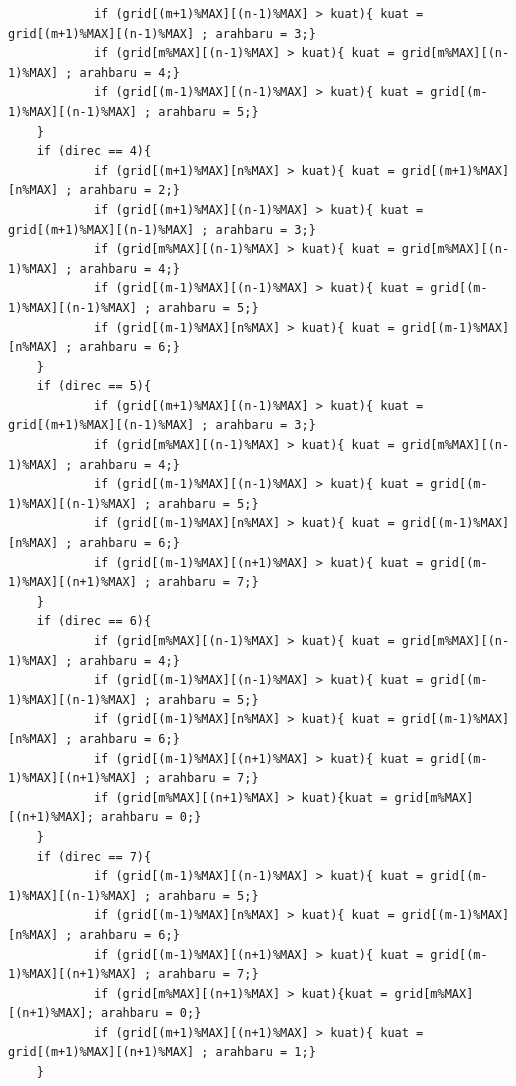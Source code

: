\documentclass[paper=a4, fontsize=11pt]{scrartcl}
\numberwithin{equation}{section} %
\numberwithin{figure}{section} %
\numberwithin{table}{section} %
\begin{document}
\begin{lstlisting}
            if (grid[(m+1)%MAX][(n-1)%MAX] > kuat){ kuat = grid[(m+1)%MAX][(n-1)%MAX] ; arahbaru = 3;}
            if (grid[m%MAX][(n-1)%MAX] > kuat){ kuat = grid[m%MAX][(n-1)%MAX] ; arahbaru = 4;}
            if (grid[(m-1)%MAX][(n-1)%MAX] > kuat){ kuat = grid[(m-1)%MAX][(n-1)%MAX] ; arahbaru = 5;}
    }
    if (direc == 4){
            if (grid[(m+1)%MAX][n%MAX] > kuat){ kuat = grid[(m+1)%MAX][n%MAX] ; arahbaru = 2;}
            if (grid[(m+1)%MAX][(n-1)%MAX] > kuat){ kuat = grid[(m+1)%MAX][(n-1)%MAX] ; arahbaru = 3;}
            if (grid[m%MAX][(n-1)%MAX] > kuat){ kuat = grid[m%MAX][(n-1)%MAX] ; arahbaru = 4;}
            if (grid[(m-1)%MAX][(n-1)%MAX] > kuat){ kuat = grid[(m-1)%MAX][(n-1)%MAX] ; arahbaru = 5;}
            if (grid[(m-1)%MAX][n%MAX] > kuat){ kuat = grid[(m-1)%MAX][n%MAX] ; arahbaru = 6;}
    }
    if (direc == 5){
            if (grid[(m+1)%MAX][(n-1)%MAX] > kuat){ kuat = grid[(m+1)%MAX][(n-1)%MAX] ; arahbaru = 3;}
            if (grid[m%MAX][(n-1)%MAX] > kuat){ kuat = grid[m%MAX][(n-1)%MAX] ; arahbaru = 4;}
            if (grid[(m-1)%MAX][(n-1)%MAX] > kuat){ kuat = grid[(m-1)%MAX][(n-1)%MAX] ; arahbaru = 5;}
            if (grid[(m-1)%MAX][n%MAX] > kuat){ kuat = grid[(m-1)%MAX][n%MAX] ; arahbaru = 6;}
            if (grid[(m-1)%MAX][(n+1)%MAX] > kuat){ kuat = grid[(m-1)%MAX][(n+1)%MAX] ; arahbaru = 7;}
    }
    if (direc == 6){
            if (grid[m%MAX][(n-1)%MAX] > kuat){ kuat = grid[m%MAX][(n-1)%MAX] ; arahbaru = 4;}
            if (grid[(m-1)%MAX][(n-1)%MAX] > kuat){ kuat = grid[(m-1)%MAX][(n-1)%MAX] ; arahbaru = 5;}
            if (grid[(m-1)%MAX][n%MAX] > kuat){ kuat = grid[(m-1)%MAX][n%MAX] ; arahbaru = 6;}
            if (grid[(m-1)%MAX][(n+1)%MAX] > kuat){ kuat = grid[(m-1)%MAX][(n+1)%MAX] ; arahbaru = 7;}
            if (grid[m%MAX][(n+1)%MAX] > kuat){kuat = grid[m%MAX][(n+1)%MAX]; arahbaru = 0;}
    }
    if (direc == 7){
            if (grid[(m-1)%MAX][(n-1)%MAX] > kuat){ kuat = grid[(m-1)%MAX][(n-1)%MAX] ; arahbaru = 5;}
            if (grid[(m-1)%MAX][n%MAX] > kuat){ kuat = grid[(m-1)%MAX][n%MAX] ; arahbaru = 6;}
            if (grid[(m-1)%MAX][(n+1)%MAX] > kuat){ kuat = grid[(m-1)%MAX][(n+1)%MAX] ; arahbaru = 7;}
            if (grid[m%MAX][(n+1)%MAX] > kuat){kuat = grid[m%MAX][(n+1)%MAX]; arahbaru = 0;}
            if (grid[(m+1)%MAX][(n+1)%MAX] > kuat){ kuat = grid[(m+1)%MAX][(n+1)%MAX] ; arahbaru = 1;}
    }
    

\end{lstlisting}
\end{document}
